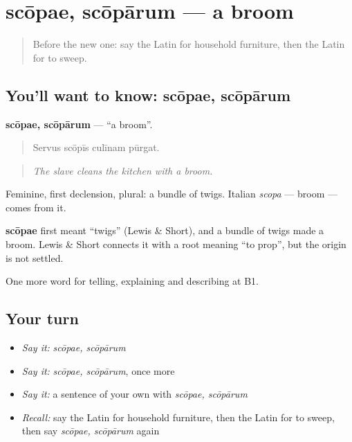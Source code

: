 \section[scōpae, scōpārum]{scōpae, scōpārum — a broom}

\label{lesson:LA-C552-scopae}



\begin{quote}
Before the new one: say the Latin for household furniture, then the Latin for to sweep.
\end{quote}

\subsection*{You'll want to know: scōpae, scōpārum}
\textbf{scōpae, scōpārum} — \textquotedblleft{}a broom\textquotedblright{}.

\begin{quote}
Servus scōpīs culīnam pūrgat.
\end{quote}

\begin{quote}
\emph{The slave cleans the kitchen with a broom.}
\end{quote}

Feminine, first declension, plural: a bundle of twigs. Italian \emph{scopa} — broom — comes from it.

\begin{cousinweb}
\textbf{scōpae} first meant \textquotedblleft{}twigs\textquotedblright{} (Lewis \& Short), and a bundle of twigs made a broom. Lewis \& Short connects it with a root meaning \textquotedblleft{}to prop\textquotedblright{}, but the origin is not settled.
\end{cousinweb}

\begin{grammarlens}[title={What you've built}]
One more word for telling, explaining and describing at B1.
\end{grammarlens}

\subsection*{Your turn}
\begin{itemize}
\raggedright
  \item \emph{Say it:} \emph{scōpae, scōpārum}
  \item \emph{Say it:} \emph{scōpae, scōpārum}, once more
  \item \emph{Say it:} a sentence of your own with \emph{scōpae, scōpārum}
  \item \emph{Recall:} say the Latin for household furniture, then the Latin for to sweep, then say \emph{scōpae, scōpārum} again
\end{itemize}

